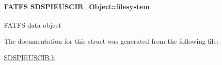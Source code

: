 \paragraph[{filesystem}]{\setlength{\rightskip}{0pt plus 5cm}F\+A\+T\+F\+S S\+D\+S\+P\+I\+E\+U\+S\+C\+I\+B\+\_\+\+Object\+::filesystem}\label{struct_s_d_s_p_i_e_u_s_c_i_b___object_ab6b0744727dfe999c9e73177cb81509e}
F\+A\+T\+F\+S data object 

The documentation for this struct was generated from the following file\+:\begin{DoxyCompactItemize}
\item 
\hyperlink{_s_d_s_p_i_e_u_s_c_i_b_8h}{S\+D\+S\+P\+I\+E\+U\+S\+C\+I\+B.\+h}\end{DoxyCompactItemize}
